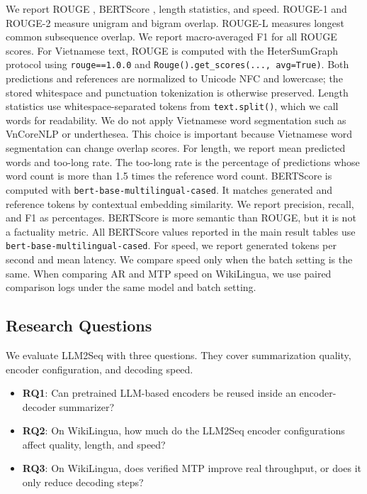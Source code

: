 \documentclass[11pt]{article}
\begin{document}
We report ROUGE \citep{lin2004rouge}, BERTScore \citep{zhang2020bertscore}, length statistics, and speed.
ROUGE-1 and ROUGE-2 measure unigram and bigram overlap.
ROUGE-L measures longest common subsequence overlap.
We report macro-averaged F1 for all ROUGE scores.
For Vietnamese text, ROUGE is computed with the HeterSumGraph protocol using
\texttt{rouge==1.0.0} and \texttt{Rouge().get\_scores(..., avg=True)}.
Both predictions and references are normalized to Unicode NFC and lowercase;
the stored whitespace and punctuation tokenization is otherwise preserved.
Length statistics use whitespace-separated tokens from \texttt{text.split()}, which we call words for readability.
We do not apply Vietnamese word segmentation such as VnCoreNLP or underthesea.
This choice is important because Vietnamese word segmentation can change overlap scores.
For length, we report mean predicted words and too-long rate.
The too-long rate is the percentage of predictions whose word count is more than 1.5 times the reference word count.
BERTScore is computed with \texttt{bert-base-multilingual-cased}.
It matches generated and reference tokens by contextual embedding similarity.
We report precision, recall, and F1 as percentages.
BERTScore is more semantic than ROUGE, but it is not a factuality metric.
All BERTScore values reported in the main result tables use \texttt{bert-base-multilingual-cased}.
For speed, we report generated tokens per second and mean latency.
We compare speed only when the batch setting is the same.
When comparing AR and MTP speed on WikiLingua, we use paired comparison logs under the same model and batch setting.

\subsection{Research Questions}

We evaluate LLM2Seq with three questions.
They cover summarization quality, encoder configuration, and decoding speed.
\begin{itemize}
    \item \textbf{RQ1}: Can pretrained LLM-based encoders be reused inside an encoder-decoder summarizer?
    \item \textbf{RQ2}: On WikiLingua, how much do the LLM2Seq encoder configurations affect quality, length, and speed?
    \item \textbf{RQ3}: On WikiLingua, does verified MTP improve real throughput, or does it only reduce decoding steps?
\end{itemize}
\end{document}
